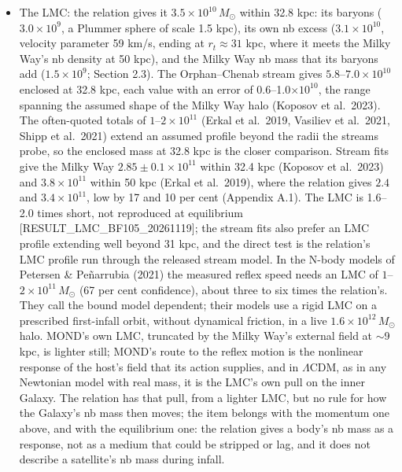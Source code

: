 \documentclass[
  10pt,
]{article}
\begin{document}
\begin{itemize}
\item The LMC: the relation gives it $3.5\times10^{10}\,M_\odot$ within 32.8 kpc: its baryons ($3.0\times10^9$, a Plummer sphere of scale 1.5 kpc), its own nb excess ($3.1\times10^{10}$, velocity parameter 59 km/s, ending at $r_t\approx31$ kpc, where it meets the Milky Way's nb density at 50 kpc), and the Milky Way nb mass that its baryons add ($1.5\times10^9$; Section 2.3). The Orphan--Chenab stream gives $5.8$--$7.0\times10^{10}$ enclosed at 32.8 kpc, each value with an error of 0.6--1.0$\times10^{10}$, the range spanning the assumed shape of the Milky Way halo (Koposov et al.~2023). The often-quoted totals of $1$--$2\times10^{11}$ (Erkal et al.~2019, Vasiliev et al.~2021, Shipp et al.~2021) extend an assumed profile beyond the radii the streams probe, so the enclosed mass at 32.8 kpc is the closer comparison. Stream fits give the Milky Way $2.85\pm0.1\times10^{11}$ within 32.4 kpc (Koposov et al.~2023) and $3.8\times10^{11}$ within 50 kpc (Erkal et al.~2019), where the relation gives $2.4$ and $3.4\times10^{11}$, low by 17 and 10 per cent (Appendix A.1). The LMC is 1.6--2.0 times short, not reproduced at equilibrium {[}RESULT\_LMC\_BF105\_20261119{]}; the stream fits also prefer an LMC profile extending well beyond 31 kpc, and the direct test is the relation's LMC profile run through the released stream model. In the N-body models of Petersen \& Pe\~narrubia (2021) the measured reflex speed needs an LMC of $1$--$2\times10^{11}\,M_\odot$ (67 per cent confidence), about three to six times the relation's. They call the bound model dependent; their models use a rigid LMC on a prescribed first-infall orbit, without dynamical friction, in a live $1.6\times10^{12}\,M_\odot$ halo. MOND's own LMC, truncated by the Milky Way's external field at $\sim$9 kpc, is lighter still; MOND's route to the reflex motion is the nonlinear response of the host's field that its action supplies, and in $\Lambda$CDM, as in any Newtonian model with real mass, it is the LMC's own pull on the inner Galaxy. The relation has that pull, from a lighter LMC, but no rule for how the Galaxy's nb mass then moves; the item belongs with the momentum one above, and with the equilibrium one: the relation gives a body's nb mass as a response, not as a medium that could be stripped or lag, and it does not describe a satellite's nb mass during infall.

\end{itemize}
\end{document}

